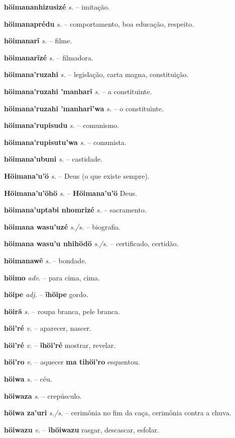 \textbf{höimananhizusizé} \textit{s.} -- imitação.

\textbf{höimanaprédu} \textit{s.} -- comportamento, boa educação, respeito.

\textbf{höimanarĩ} \textit{s.} -- filme.

\textbf{höimanarĩzé} \textit{s.} -- filmadora.

\textbf{höimana'ruzahi} \textit{s.} -- legislação, carta magna, constituição.

\textbf{höimana'ruzahi 'manharĩ} \textit{s.} -- a constituinte.

\textbf{höimana'ruzahi 'manharĩ'wa} \textit{s.} -- o constituinte.

\textbf{höimana'rupisudu} \textit{s.} -- comunismo.

\textbf{höimana'rupisutu'wa} \textit{s.} -- comunista.

\textbf{höimana'ubuni} \textit{s.} -- castidade.

\textbf{Höimana'u'ö} \textit{s.} -- Deus (o que existe sempre).

\textbf{Höimana'u'öhö} \textit{s.} -- \textbf{Höimana'u'ö} Deus.

\textbf{höimana'uptabi nhomrizé} \textit{s.} -- sacramento.

\textbf{höimana wasu'uzé} \textit{s./s.} -- biografia.

\textbf{höimana wasu'u nhihödö} \textit{s./s.} -- certificado, certidão.

\textbf{höimanawẽ} \textit{s.} -- bondade.

\textbf{höimo} \textit{adv.} -- para cima, cima.

\textbf{höipe} \textit{adj.} -- \textbf{ĩhöipe} gordo.

\textbf{höirã} \textit{s.} -- roupa branca, pele branca.

\textbf{höi'ré} \textit{v.} -- aparecer, nascer.

\textbf{höi'ré} \textit{v.} -- \textbf{ĩhöi'ré} mostrar, revelar.

\textbf{höi'ro} \textit{v.} -- aquecer  \textbf{ma tihöi'ro} esquentou.

\textbf{höiwa} \textit{s.} -- céu.

\textbf{höiwaza} \textit{s.} -- crepúsculo.

\textbf{höiwa za'uri} \textit{s./s.} -- cerimônia no fim da caça, cerimônia contra a chuva.

\textbf{höiwazu} \textit{v.} -- \textbf{ĩhöiwazu} rasgar, descascar, esfolar.

